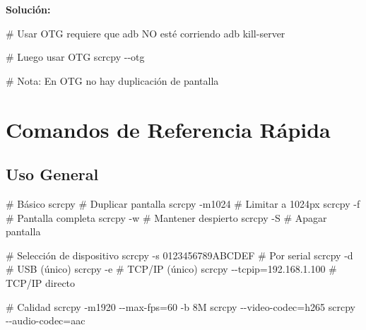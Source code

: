 \documentclass[
  doc,
  floatsintext,
  longtable,
  a4paper,
  nolmodern,
  notxfonts,
  notimes,
  12pt,
  colorlinks=true,linkcolor=blue,citecolor=blue,urlcolor=blue]{apa7}
\newenvironment{Shaded}{\begin{snugshade}}{\end{snugshade}}
\newcommand{\AttributeTok}[1]{\textcolor[rgb]{0.40,0.45,0.13}{#1}}
\newcommand{\CommentTok}[1]{\textcolor[rgb]{0.37,0.37,0.37}{#1}}
\newcommand{\ExtensionTok}[1]{\textcolor[rgb]{0.00,0.23,0.31}{#1}}
\newcommand{\NormalTok}[1]{\textcolor[rgb]{0.00,0.23,0.31}{#1}}
\newcommand{\OperatorTok}[1]{\textcolor[rgb]{0.37,0.37,0.37}{#1}}
\begin{document}
\textbf{Solución:}

\begin{Shaded}
\begin{Highlighting}[]
\CommentTok{\# Usar OTG requiere que adb NO esté corriendo}
\ExtensionTok{adb}\NormalTok{ kill{-}server}

\CommentTok{\# Luego usar OTG}
\ExtensionTok{scrcpy} \AttributeTok{{-}{-}otg}

\CommentTok{\# Nota: En OTG no hay duplicación de pantalla}
\end{Highlighting}
\end{Shaded}

\section{Comandos de Referencia
Rápida}\label{comandos-de-referencia-ruxe1pida}

\subsection{Uso General}\label{uso-general}

\begin{Shaded}
\begin{Highlighting}[]
\CommentTok{\# Básico}
\ExtensionTok{scrcpy}                          \CommentTok{\# Duplicar pantalla}
\ExtensionTok{scrcpy} \AttributeTok{{-}m1024}                   \CommentTok{\# Limitar a 1024px}
\ExtensionTok{scrcpy} \AttributeTok{{-}f}                       \CommentTok{\# Pantalla completa}
\ExtensionTok{scrcpy} \AttributeTok{{-}w}                       \CommentTok{\# Mantener despierto}
\ExtensionTok{scrcpy} \AttributeTok{{-}S}                       \CommentTok{\# Apagar pantalla}

\CommentTok{\# Selección de dispositivo}
\ExtensionTok{scrcpy} \AttributeTok{{-}s}\NormalTok{ 0123456789ABCDEF      }\CommentTok{\# Por serial}
\ExtensionTok{scrcpy} \AttributeTok{{-}d}                       \CommentTok{\# USB (único)}
\ExtensionTok{scrcpy} \AttributeTok{{-}e}                       \CommentTok{\# TCP/IP (único)}
\ExtensionTok{scrcpy} \AttributeTok{{-}{-}tcpip}\OperatorTok{=}\NormalTok{192.168.1.100    }\CommentTok{\# TCP/IP directo}

\CommentTok{\# Calidad}
\ExtensionTok{scrcpy} \AttributeTok{{-}m1920} \AttributeTok{{-}{-}max{-}fps}\OperatorTok{=}\NormalTok{60 }\AttributeTok{{-}b}\NormalTok{ 8M}
\ExtensionTok{scrcpy} \AttributeTok{{-}{-}video{-}codec}\OperatorTok{=}\NormalTok{h265}
\ExtensionTok{scrcpy} \AttributeTok{{-}{-}audio{-}codec}\OperatorTok{=}\NormalTok{aac}
\end{Highlighting}
\end{Shaded}
\end{document}
